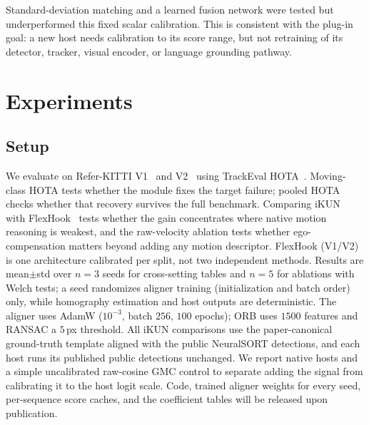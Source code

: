 \documentclass[sigconf,anonymous,nonacm]{acmart}
\begin{document}
Standard-deviation matching and a learned fusion network were tested but underperformed this fixed scalar calibration. This is consistent with the plug-in goal: a new host needs calibration to its score range, but not retraining of its detector, tracker, visual encoder, or language grounding pathway.

\section{Experiments}
\label{sec:exp}

\subsection{Setup}
\label{sec:setup}

We evaluate on Refer-KITTI V1~\cite{transrmot} and V2~\cite{temprmot} using TrackEval HOTA~\cite{hota}. Moving-class HOTA tests whether the module fixes the target failure; pooled HOTA checks whether that recovery survives the full benchmark. Comparing iKUN~\cite{ikun} with FlexHook~\cite{flexhook} tests whether the gain concentrates where native motion reasoning is weakest, and the raw-velocity ablation tests whether ego-compensation matters beyond adding any motion descriptor. FlexHook (V1/V2) is one architecture calibrated per split, not two independent methods. Results are mean$\pm$std over $n{=}3$ seeds for cross-setting tables and $n{=}5$ for ablations with Welch tests; a seed randomizes aligner training (initialization and batch order) only, while homography estimation and host outputs are deterministic. The aligner uses AdamW ($10^{-3}$, batch $256$, $100$ epochs); ORB uses $1500$ features and RANSAC a $5$\,px threshold. All iKUN comparisons use the paper-canonical ground-truth template aligned with the public NeuralSORT detections, and each host runs its published public detections unchanged. We report native hosts and a simple uncalibrated raw-cosine GMC control to separate adding the signal from calibrating it to the host logit scale. Code, trained aligner weights for every seed, per-sequence score caches, and the coefficient tables will be released upon publication.
\end{document}
